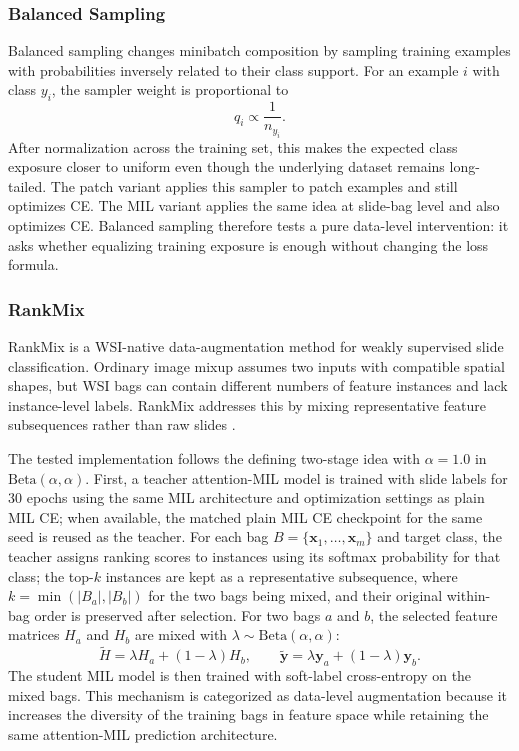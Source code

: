 \documentclass[11pt]{article}
\begin{document}
\subsubsection{Balanced Sampling}
Balanced sampling changes minibatch composition by sampling training examples with probabilities inversely related to their class support. For an example $i$ with class $y_i$, the sampler weight is proportional to
\begin{equation}
  q_i \propto \frac{1}{n_{y_i}}.
  \label{eq:balanced-sampling}
\end{equation}
After normalization across the training set, this makes the expected class exposure closer to uniform even though the underlying dataset remains long-tailed. The patch variant applies this sampler to patch examples and still optimizes CE. The MIL variant applies the same idea at slide-bag level and also optimizes CE. Balanced sampling therefore tests a pure data-level intervention: it asks whether equalizing training exposure is enough without changing the loss formula.

\subsubsection{RankMix}
RankMix is a WSI-native data-augmentation method for weakly supervised slide classification. Ordinary image mixup assumes two inputs with compatible spatial shapes, but WSI bags can contain different numbers of feature instances and lack instance-level labels. RankMix addresses this by mixing representative feature subsequences rather than raw slides \citep{chen2023rankmix}.

The tested implementation follows the defining two-stage idea with $\alpha=1.0$ in $\mathrm{Beta}(\alpha,\alpha)$. First, a teacher attention-MIL model is trained with slide labels for 30 epochs using the same MIL architecture and optimization settings as plain MIL CE; when available, the matched plain MIL CE checkpoint for the same seed is reused as the teacher. For each bag $B=\{\mathbf{x}_1,\ldots,\mathbf{x}_m\}$ and target class, the teacher assigns ranking scores to instances using its softmax probability for that class; the top-$k$ instances are kept as a representative subsequence, where $k=\min(|B_a|,|B_b|)$ for the two bags being mixed, and their original within-bag order is preserved after selection. For two bags $a$ and $b$, the selected feature matrices $H_a$ and $H_b$ are mixed with $\lambda\sim\mathrm{Beta}(\alpha,\alpha)$:
\begin{equation}
  \widetilde{H}=\lambda H_a+(1-\lambda)H_b,
  \qquad
  \widetilde{\mathbf{y}}=\lambda \mathbf{y}_a+(1-\lambda)\mathbf{y}_b.
  \label{eq:rankmix}
\end{equation}
The student MIL model is then trained with soft-label cross-entropy on the mixed bags. This mechanism is categorized as data-level augmentation because it increases the diversity of the training bags in feature space while retaining the same attention-MIL prediction architecture.
\end{document}

